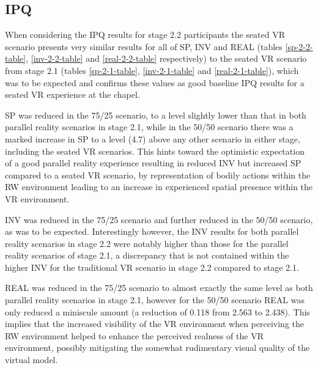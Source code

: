 
\subsection{IPQ}

When considering the IPQ results for stage 2.2 participants the seated VR scenario presents very similar results for all of SP, INV and REAL (tables \ref{sp-2-2-table}, \ref{inv-2-2-table} and \ref{real-2-2-table} respectively) to the seated VR scenario from stage 2.1 (tables \ref{sp-2-1-table}, \ref{inv-2-1-table} and \ref{real-2-1-table}), which was to be expected and confirms these values as good baseline IPQ results for a seated VR experience at the chapel.

SP was reduced in the 75/25 scenario, to a level slightly lower than that in both parallel reality scenarios in stage 2.1, while in the 50/50 scenario there was a marked increase in SP to a level (4.7) above any other scenario in either stage, including the seated VR scenarios. This hints toward the optimistic expectation of a good parallel reality experience resulting in reduced INV but increased SP compared to a seated VR scenario, by representation of bodily actions within the RW environment leading to an increase in experienced spatial presence within the VR environment.

INV was reduced in the 75/25 scenario and further reduced in the 50/50 scenario, as was to be expected. Interestingly however, the INV results for both parallel reality scenarios in stage 2.2 were notably higher than those for the parallel reality scenarios of stage 2.1, a discrepancy that is not contained within the higher INV for the traditional VR scenario in stage 2.2 compared to stage 2.1.

REAL was reduced in the 75/25 scenario to almost exactly the same level as both parallel reality scenarios in stage 2.1, however for the 50/50 scenario REAL was only reduced a miniscule amount (a reduction of 0.118 from 2.563 to 2.438). This implies that the increased visibility of the VR environment when perceiving the RW environment helped to enhance the perceived realness of the VR environment, possibly mitigating the somewhat rudimentary visual quality of the virtual model.


